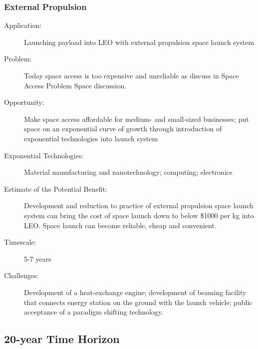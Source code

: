  
\subsubsection{External Propulsion}
\label{extprop}
\begin{description}  \item[Application:] Launching payload into \gls{LEO} with external propulsion space launch  system
 
\item[Problem:]  Today space access is too expensive and unreliable as discuss in Space  Access Problem Space discussion.
 
\item[Opportunity:] Make space  access affordable for medium- and small-sized businesses; put space on  an exponential curve of growth through introduction of exponential  technologies into launch system
 
\item[Exponential Technologies:]  Material manufacturing and nanotechnology; computing; electronics
 
\item[Estimate  of the Potential Benefit:] Development and reduction to practice of  external propulsion space launch system can bring the cost of space  launch down to below \$1000 per kg into \gls{LEO}. Space launch can become  reliable, cheap and convenient. 
 
\item[Timescale:] 5-7 years
 
\item[Challenges:]  Development of a heat-exchange engine; development of beaming facility  that connects energy station on the ground with the launch vehicle;  public acceptance of a paradigm shifting technology.
 
\end{description}

\subsection{20-year Time Horizon}

